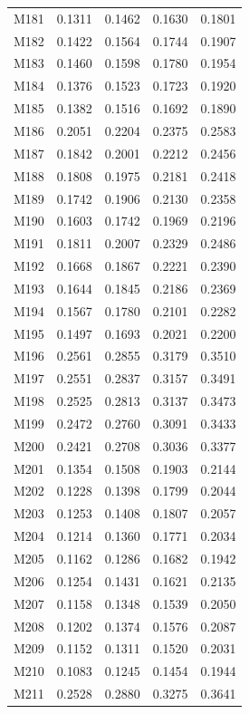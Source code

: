 \begin{longtable}{lrrrr}
M181 & 0.1311 & 0.1462 & 0.1630 & 0.1801 \\
M182 & 0.1422 & 0.1564 & 0.1744 & 0.1907 \\
M183 & 0.1460 & 0.1598 & 0.1780 & 0.1954 \\
M184 & 0.1376 & 0.1523 & 0.1723 & 0.1920 \\
M185 & 0.1382 & 0.1516 & 0.1692 & 0.1890 \\
M186 & 0.2051 & 0.2204 & 0.2375 & 0.2583 \\
M187 & 0.1842 & 0.2001 & 0.2212 & 0.2456 \\
M188 & 0.1808 & 0.1975 & 0.2181 & 0.2418 \\
M189 & 0.1742 & 0.1906 & 0.2130 & 0.2358 \\
M190 & 0.1603 & 0.1742 & 0.1969 & 0.2196 \\
M191 & 0.1811 & 0.2007 & 0.2329 & 0.2486 \\
M192 & 0.1668 & 0.1867 & 0.2221 & 0.2390 \\
M193 & 0.1644 & 0.1845 & 0.2186 & 0.2369 \\
M194 & 0.1567 & 0.1780 & 0.2101 & 0.2282 \\
M195 & 0.1497 & 0.1693 & 0.2021 & 0.2200 \\
M196 & 0.2561 & 0.2855 & 0.3179 & 0.3510 \\
M197 & 0.2551 & 0.2837 & 0.3157 & 0.3491 \\
M198 & 0.2525 & 0.2813 & 0.3137 & 0.3473 \\
M199 & 0.2472 & 0.2760 & 0.3091 & 0.3433 \\
M200 & 0.2421 & 0.2708 & 0.3036 & 0.3377 \\
M201 & 0.1354 & 0.1508 & 0.1903 & 0.2144 \\
M202 & 0.1228 & 0.1398 & 0.1799 & 0.2044 \\
M203 & 0.1253 & 0.1408 & 0.1807 & 0.2057 \\
M204 & 0.1214 & 0.1360 & 0.1771 & 0.2034 \\
M205 & 0.1162 & 0.1286 & 0.1682 & 0.1942 \\
M206 & 0.1254 & 0.1431 & 0.1621 & 0.2135 \\
M207 & 0.1158 & 0.1348 & 0.1539 & 0.2050 \\
M208 & 0.1202 & 0.1374 & 0.1576 & 0.2087 \\
M209 & 0.1152 & 0.1311 & 0.1520 & 0.2031 \\
M210 & 0.1083 & 0.1245 & 0.1454 & 0.1944 \\
M211 & 0.2528 & 0.2880 & 0.3275 & 0.3641 \\

\end{longtable}
